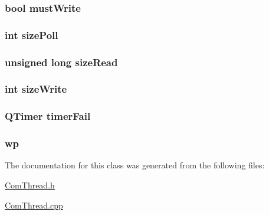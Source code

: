 \hypertarget{a00002_a951ec1a18196d806edaf6d3fb517a239}{
\subsubsection[{must\-Write}]{\setlength{\rightskip}{0pt plus 5cm}bool must\-Write\hspace{0.3cm}{\ttfamily [private]}}}\label{a00002_a951ec1a18196d806edaf6d3fb517a239}
\hypertarget{a00002_a608be86b18e15c3309a1b50794a2115c}{
\subsubsection[{size\-Poll}]{\setlength{\rightskip}{0pt plus 5cm}int size\-Poll\hspace{0.3cm}{\ttfamily [private]}}}\label{a00002_a608be86b18e15c3309a1b50794a2115c}
\hypertarget{a00002_ad9f5381795006f1f187538296368cd11}{
\subsubsection[{size\-Read}]{\setlength{\rightskip}{0pt plus 5cm}unsigned long size\-Read\hspace{0.3cm}{\ttfamily [private]}}}\label{a00002_ad9f5381795006f1f187538296368cd11}
\hypertarget{a00002_ad1e1c4a0c8bb235b5e26ec9c5d1c3f0d}{
\subsubsection[{size\-Write}]{\setlength{\rightskip}{0pt plus 5cm}int size\-Write\hspace{0.3cm}{\ttfamily [private]}}}\label{a00002_ad1e1c4a0c8bb235b5e26ec9c5d1c3f0d}
\hypertarget{a00002_a578f5ec7742dce06b86799b36f1d138c}{
\subsubsection[{timer\-Fail}]{\setlength{\rightskip}{0pt plus 5cm}Q\-Timer timer\-Fail\hspace{0.3cm}{\ttfamily [private]}}}\label{a00002_a578f5ec7742dce06b86799b36f1d138c}
\hypertarget{a00002_a0dff6629133ecc492d6b9ab44b60cb80}{
\subsubsection[{wp}]{ wp\hspace{0.3cm}{\ttfamily [private]}}}\label{a00002_a0dff6629133ecc492d6b9ab44b60cb80}


The documentation for this class was generated from the following files\-:\begin{DoxyCompactItemize}
\item 
\hyperlink{a00004}{Com\-Thread.\-h}\item 
\hyperlink{a00020}{Com\-Thread.\-cpp}\end{DoxyCompactItemize}
